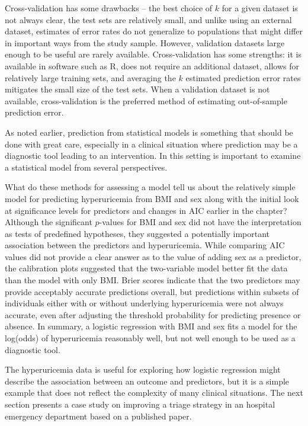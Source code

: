 Cross-validation has some drawbacks -- the best choice of $k$ for a given dataset is not always clear, the test sets are relatively small, and unlike using an external dataset, estimates of error rates do not generalize to populations that might differ in  important ways from the study sample.  However, validation datasets large enough to be useful are rarely available. Cross-validation has some strengths: it is available in software such as \textsf{R}, does not require an additional dataset, allows for relatively large training sets, and averaging the $k$ estimated prediction error rates mitigates the small size of the test sets.  When a validation dataset is not available, cross-validation is the preferred method of estimating out-of-sample prediction error.

As noted earlier, prediction from statistical models is something that should be done with great care, especially in a clinical situation where prediction may be a diagnostic tool leading to an intervention.  In this setting is important to examine a statistical model from several perspectives.  

What do these methods for assessing a model tell us about the relatively simple model for predicting hyperuricemia from BMI and sex along with the initial look at significance levels for predictors and changes in AIC earlier in the chapter?  Although the significant $p$-values for BMI and sex did not have the interpretation as tests of predefined hypotheses, they suggested a potentially important association between the predictors and hyperuricemia.  While comparing AIC values did not provide a clear answer as to the value of adding sex as a predictor, the calibration plots suggested that the two-variable model better fit the data than the model with only BMI.  Brier scores indicate that the two predictors may provide acceptably accurate predictions overall, but predictions within subsets of individuals either with or without underlying hyperuricemia were not always accurate, even after adjusting the threshold probability for predicting presence or absence.  In summary, a logistic regression with BMI and sex fits a model for the log(odds) of hyperuricemia reasonably well, but not well enough to be used as a diagnostic tool.

The hyperuricemia data is useful for exploring how logistic regression might describe the association between an outcome and predictors, but it is a simple example that does not reflect the complexity of many clinical situations.  The next section presents a case study on improving a triage strategy in an hospital emergency department based on a published paper.


